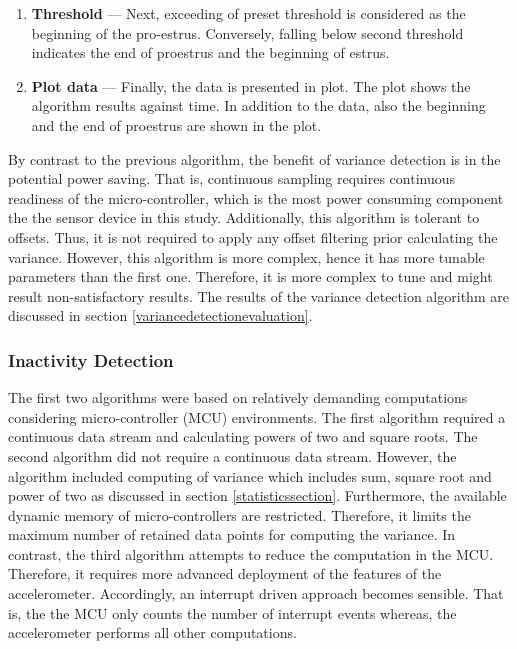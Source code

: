 \documentclass[english,12pt,a4paper,pdftex,elec,utf8]{aaltothesis}
\begin{document}
\begin{enumerate}
\item \textbf{Threshold} --- Next, exceeding of preset threshold is considered as the beginning of the pro-estrus. Conversely, falling below second threshold indicates the end of proestrus and the beginning of estrus.

\item \textbf{Plot data} --- Finally, the data is presented in plot. The plot shows the algorithm results against time. In addition to the data, also the beginning and the end of proestrus are shown in the plot.

\end{enumerate}

By contrast to the previous algorithm, the benefit of variance detection is in the potential power saving. That is, continuous sampling requires continuous readiness of the micro-controller, which is the most power consuming component the the sensor device in this study. Additionally, this algorithm is tolerant to offsets. Thus, it is not required to apply any offset filtering prior calculating the variance. However, this algorithm is more complex, hence it has more tunable parameters than the first one. Therefore, it is more complex to tune and might result non-satisfactory results. The results of the variance detection algorithm are discussed in section \ref{variancedetectionevaluation}. 

\subsubsection{Inactivity Detection} \label{inactivitydetectionsection}

The first two algorithms were based on relatively demanding computations considering micro-controller (MCU) environments. The first algorithm required a continuous data stream and calculating powers of two and square roots. The second algorithm did not require a continuous data stream. However, the algorithm included computing of variance which includes sum, square root and power of two as discussed in section \ref{statisticssection}. Furthermore, the available dynamic memory of micro-controllers are restricted. Therefore, it limits the maximum number of retained data points for computing the variance. In contrast, the third algorithm attempts to reduce the computation in the MCU. Therefore, it requires more advanced deployment of the features of the accelerometer. Accordingly, an interrupt driven approach becomes sensible. That is, the the MCU only counts the number of interrupt events whereas, the accelerometer performs all other computations. 
\end{document}
